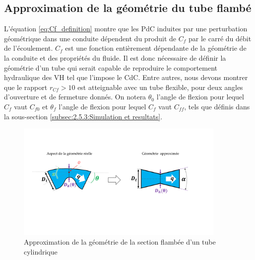 	\subsection{Approximation de la géométrie du tube flambé}
	\label{subsec:5.3.1 - Approximation de la géométrie du tube flambé}
L’équation \ref{eq:Cf_definition} montre que les PdC induites par une perturbation
géométrique dans une conduite dépendent du produit de $C_f$ par le carré du débit de l’écoulement. $C_f$ est une fonction entièrement dépendante de la géométrie de la conduite et des propriétés du fluide. Il est donc nécessaire de définir la géométrie d’un tube qui serait capable de reproduire le comportement hydraulique des VH tel que l’impose le CdC. Entre autres, nous devons montrer que le rapport $r_{Cf}>10$ est atteignable avec un tube flexible, pour deux angles d’ouverture et de fermeture donnés. On notera $\theta_{0}$ l'angle de flexion pour lequel $C_f$ vaut $C_{f0}$ et $\theta_{f}$ l'angle de flexion pour lequel $C_f$ vaut $C_{ff}$, tels que définis dans la sous-section \ref{subsec:2.5.3:Simulation et resultats}.
\begin{figure}[!htb]
	\begin{center}
		\captionsetup{justification=centering}
		\includegraphics[trim={3cm 7cm 4.5cm 4cm},clip,width=0.9\textwidth]{../Chap5/Figure/geometrie_approx.pdf}
		\caption{Approximation de la géométrie de la section flambée d'un tube cylindrique}
		\label{fig:geometrie_approx}
	\end{center}
\end{figure}

